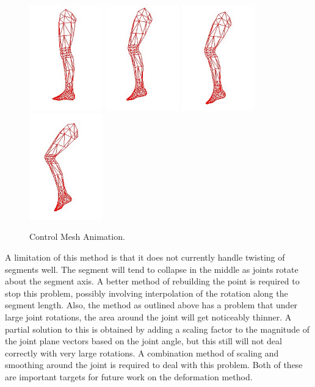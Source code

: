 \documentclass[10pt,oneside,fleqn,a4paper]{book}
\begin{document}
\begin{figure}
\begin{center}
\includegraphics[width=3.18cm]{../images/low_leg_1}
\includegraphics[width=3.18cm]{../images/low_leg_2}
\includegraphics[width=3.18cm]{../images/low_leg_3}
\includegraphics[width=3.18cm]{../images/low_leg_4}
\caption[Control Mesh Animation]{\label{fig:controlmesh} Control Mesh Animation.}
\end{center}
\end{figure}

A limitation of this method is that it does not currently handle twisting of segments well. The segment will tend to collapse in the middle as joints rotate about the segment axis. A better method of rebuilding the point is required to stop this problem, possibly involving interpolation of the rotation along the segment length. Also, the method as outlined above has a problem that under large joint rotations, the area around the joint will get noticeably thinner. A partial solution to this is obtained by adding a scaling factor to the magnitude of the joint plane vectors based on the joint angle, but this still will not deal correctly with very large rotations. A combination method of scaling and smoothing around the joint is required to deal with this problem. Both of these are important targets for future work on the deformation method.
\end{document}
